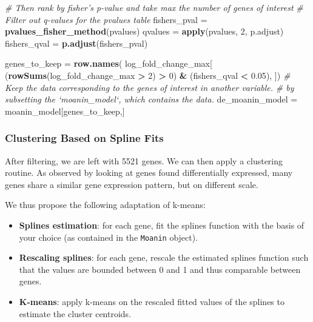 \documentclass[9pt,a4paper,]{extarticle}
\newenvironment{Shaded}{\begin{snugshade}}{\end{snugshade}}
\newcommand{\CommentTok}[1]{\textcolor[rgb]{0.56,0.35,0.01}{\textit{#1}}}
\newcommand{\DecValTok}[1]{\textcolor[rgb]{0.00,0.00,0.81}{#1}}
\newcommand{\FloatTok}[1]{\textcolor[rgb]{0.00,0.00,0.81}{#1}}
\newcommand{\KeywordTok}[1]{\textcolor[rgb]{0.13,0.29,0.53}{\textbf{#1}}}
\newcommand{\NormalTok}[1]{#1}
\newcommand{\OperatorTok}[1]{\textcolor[rgb]{0.81,0.36,0.00}{\textbf{#1}}}
\newcommand{\StringTok}[1]{\textcolor[rgb]{0.31,0.60,0.02}{#1}}
\begin{document}
\begin{Shaded}
\begin{Highlighting}[]
\CommentTok{# Then rank by fisher's p-value and take max the number of genes of interest}
\CommentTok{# Filter out q-values for the pvalues table}
\NormalTok{fishers_pval =}\StringTok{ }\KeywordTok{pvalues_fisher_method}\NormalTok{(pvalues)}
\NormalTok{qvalues =}\StringTok{ }\KeywordTok{apply}\NormalTok{(pvalues, }\DecValTok{2}\NormalTok{, p.adjust)}
\NormalTok{fishers_qval =}\StringTok{ }\KeywordTok{p.adjust}\NormalTok{(fishers_pval)}

\NormalTok{genes_to_keep =}\StringTok{ }\KeywordTok{row.names}\NormalTok{(}
\NormalTok{    log_fold_change_max[}
\NormalTok{    (}\KeywordTok{rowSums}\NormalTok{(log_fold_change_max }\OperatorTok{>}\StringTok{ }\DecValTok{2}\NormalTok{) }\OperatorTok{>}\StringTok{ }\DecValTok{0}\NormalTok{) }\OperatorTok{&}
\StringTok{    }\NormalTok{(fishers_qval }\OperatorTok{<}\StringTok{ }\FloatTok{0.05}\NormalTok{), ])}
\CommentTok{# Keep the data corresponding to the genes of interest in another variable.}
\CommentTok{# by subsetting the `moanin_model`, which contains the data.}
\NormalTok{de_moanin_model =}\StringTok{ }\NormalTok{moanin_model[genes_to_keep,]}
\end{Highlighting}
\end{Shaded}

\hypertarget{clustering-based-on-spline-fits}{%
\subsubsection{Clustering Based on Spline Fits}\label{clustering-based-on-spline-fits}}

After filtering, we are left with 5521 genes. We can then apply a
clustering routine. As observed by looking at genes found differentially expressed,
many genes share a similar gene expression pattern, but on different scale.

We thus propose the following adaptation of k-means:

\begin{itemize}
\tightlist
\item
  \textbf{Splines estimation}: for each gene, fit the splines function with the basis
  of your choice (as contained in the \texttt{Moanin} object).
\item
  \textbf{Rescaling splines}: for each gene, rescale the estimated splines function
  such that the values are bounded between 0 and 1 and thus comparable between genes.
\item
  \textbf{K-means}: apply k-means on the rescaled fitted values of the splines to estimate the
  cluster centroids.
\end{itemize}
\end{document}
